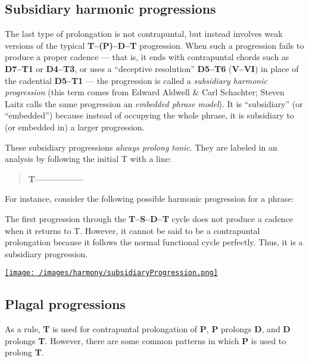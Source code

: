 \documentclass{book}
\begin{document}
\hypertarget{subsidiary-harmonic-progressions}{%
\subsection{Subsidiary harmonic
progressions}\label{subsidiary-harmonic-progressions}}

The last type of prolongation is not contrapuntal, but instead involves weak
versions of the typical \textbf{T--(P)--D--T} progression. When such a
progression fails to produce a proper cadence --- that is, it ends with
contrapuntal chords such as \textbf{D7--T1} or \textbf{D4--T3}, or uses a
``deceptive resolution'' \textbf{D5--T6} (\textbf{V--VI}) in place of the
cadential \textbf{D5--T1} --- the progression is called a \emph{subsidiary
harmonic progression} (this term comes from Edward Aldwell \& Carl Schachter;
Steven Laitz calls the same progression an \emph{embedded phrase model}). It
is ``subsidiary'' (or ``embedded'') because instead of occupying the whole
phrase, it is subsidiary to (or embedded in) a larger progression.

These subsidiary progressions \emph{always prolong tonic}. They are labeled in
an analysis by following the initial T with a line:

\begin{quote}
\textbf{T---------------}
\end{quote}

For instance, consider the following possible harmonic progression for a
phrase:

The first progression through the \textbf{T--S--D--T} cycle does not produce a
cadence when it returns to T. However, it cannot be said to be a contrapuntal
prolongation because it follows the normal functional cycle perfectly. Thus,
it is a subsidiary progression.

\href{/images/harmony/subsidiaryProgression.png}{\texttt{[image: /images/harmony/subsidiaryProgression.png]}}

\hypertarget{plagal-progressions}{%
\subsection{Plagal progressions}\label{plagal-progressions}}

As a rule, \textbf{T} is used for contrapuntal prolongation of \textbf{P},
\textbf{P} prolongs \textbf{D}, and \textbf{D} prolongs \textbf{T}. However,
there are some common patterns in which \textbf{P} is used to prolong
\textbf{T}.
\end{document}
